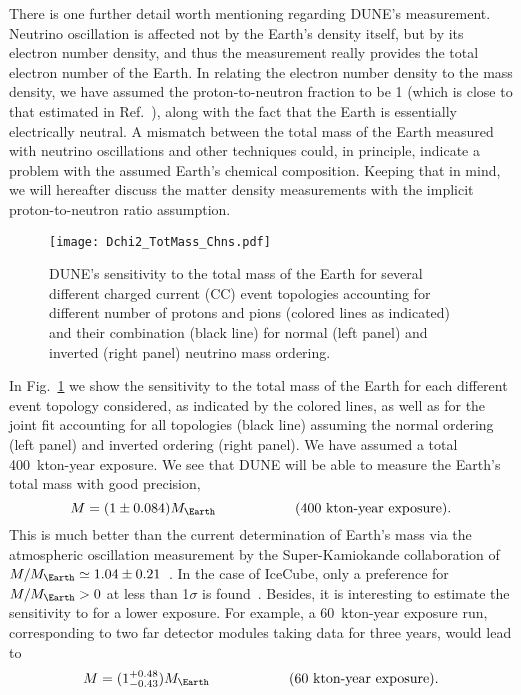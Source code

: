 There is one further detail worth mentioning regarding DUNE's measurement.
Neutrino oscillation is affected not by the Earth's density itself, but by its electron number density, and thus the measurement really provides the total electron number of the Earth.
In relating the electron number density to the mass density, we have assumed the proton-to-neutron fraction to be 1 (which is close to that estimated in Ref.~\cite{Dziewonski:1981xy}), along with the fact that the Earth is essentially electrically neutral.
A mismatch between the total mass of the Earth measured with neutrino oscillations and other techniques could, in principle, indicate a problem with the assumed Earth's chemical composition.
Keeping that in mind, we will hereafter discuss the matter density measurements with the implicit proton-to-neutron ratio assumption.

\begin{figure}
\begin{center}
\texttt{[image: Dchi2\_TotMass\_Chns.pdf]}
\caption{DUNE's sensitivity to the total mass of the Earth for several different charged current (CC) event topologies accounting for different number of protons and pions (colored lines as indicated) and their combination (black line) for normal (left panel) and inverted (right panel) neutrino mass ordering. \label{fig:TotMassChns}}
\end{center}
\end{figure}
In Fig.~\ref{fig:TotMassChns} we show the sensitivity to the total mass of the Earth for each different event topology considered, as indicated by the colored lines, as well as for the joint fit accounting for all topologies (black line) assuming the normal ordering (left panel) and inverted ordering (right panel).
We have assumed a total 400~kton-year exposure.
We see that DUNE will be able to measure the Earth's total mass with good precision, 
\begin{equation}
  M = (1\pm0.084)M_\Earth\hspace{2cm}\text{(400~kton-year exposure)}.
\end{equation}
This is much better than the current determination of Earth's mass via the atmospheric oscillation measurement by the Super-Kamiokande collaboration of $M/M_\Earth\simeq 1.04\pm0.21$~\cite{Super-Kamiokande:2017yvm}. 
In the case of IceCube,  only a preference for $M/M_\Earth > 0$ at less than 1$\sigma$ is found~\cite{IceCube:2019dyb}.
Besides, it is interesting to estimate the sensitivity to for a lower exposure.
For example, a 60~kton-year exposure run, corresponding to two far detector modules taking data for three years, would lead to
\begin{equation}
  M = (1^{+0.48}_{-0.43})M_\Earth\hspace{2cm}\text{(60~kton-year exposure)}.
\end{equation}



